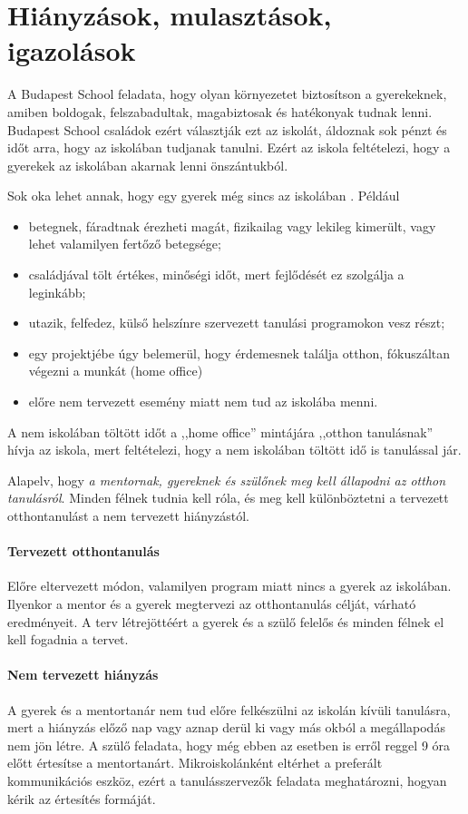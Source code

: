 \section{Hiányzások, mulasztások, igazolások}
A Budapest School feladata, hogy olyan környezetet biztosítson a gyerekeknek, amiben boldogak, felszabadultak, magabiztosak és hatékonyak tudnak lenni. Budapest School családok ezért választják ezt az iskolát, áldoznak sok pénzt és időt arra, hogy az iskolában tudjanak tanulni. Ezért az iskola feltételezi, hogy a gyerekek az iskolában akarnak lenni önszántukból.

Sok oka lehet annak, hogy egy gyerek még sincs az iskolában . Például
\begin{itemize}
    \item betegnek, fáradtnak érezheti magát, fizikailag vagy lekileg kimerült, vagy lehet valamilyen fertőző betegsége;
    \item családjával tölt értékes, minőségi időt, mert fejlődését ez szolgálja a leginkább;
    \item utazik, felfedez, külső helszínre szervezett tanulási programokon vesz részt;
    \item egy projektjébe úgy belemerül, hogy érdemesnek találja otthon, fókuszáltan végezni a munkát (home office)
    \item előre nem tervezett esemény miatt nem tud az iskolába menni.
\end{itemize}

A nem iskolában töltött időt a ,,home office'' mintájára ,,otthon tanulásnak'' hívja az iskola, mert feltételezi, hogy a nem iskolában töltött idő is tanulással jár.

Alapelv, hogy \emph{a mentornak, gyereknek és szülőnek meg kell állapodni az otthon tanulásról}. Minden félnek tudnia kell róla, és meg kell különböztetni a tervezett otthontanulást a nem tervezett hiányzástól.

\paragraph{Tervezett otthontanulás} Előre eltervezett módon, valamilyen program miatt nincs a gyerek az iskolában. Ilyenkor a mentor és a gyerek megtervezi az otthontanulás célját, várható eredményeit. A terv létrejöttéért a gyerek és a szülő felelős és minden félnek el kell fogadnia a tervet.

\paragraph{Nem tervezett hiányzás} A gyerek és a mentortanár nem tud előre felkészülni az iskolán kívüli tanulásra, mert a hiányzás előző nap vagy aznap derül ki vagy más okból a megállapodás nem jön létre. A szülő feladata, hogy még ebben az esetben is erről reggel 9 óra előtt értesítse a mentortanárt. Mikroiskolánként eltérhet a preferált kommunikációs eszköz, ezért a tanulásszervezők feladata meghatározni, hogyan kérik az értesítés formáját.

